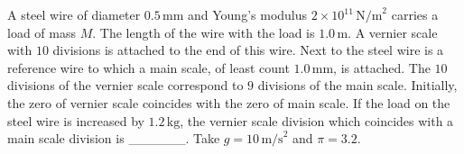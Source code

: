 
    \item A steel wire of diameter \(0.5 \, \text{mm}\) and Young's modulus \(2 \times 10^{11} \, \text{N/m}^2\) carries a load of mass \(M\). The length of the wire with the load is \(1.0 \, \text{m}\). A vernier scale with \(10\) divisions is attached to the end of this wire. Next to the steel wire is a reference wire to which a main scale, of least count \(1.0 \, \text{mm}\), is attached. The \(10\) divisions of the vernier scale correspond to \(9\) divisions of the main scale. Initially, the zero of vernier scale coincides with the zero of main scale. If the load on the steel wire is increased by \(1.2 \, \text{kg}\), the vernier scale division which coincides with a main scale division is \_\_\_\_\_\_. Take \(g = 10 \, \text{m/s}^2\) and \(\pi = 3.2\).
